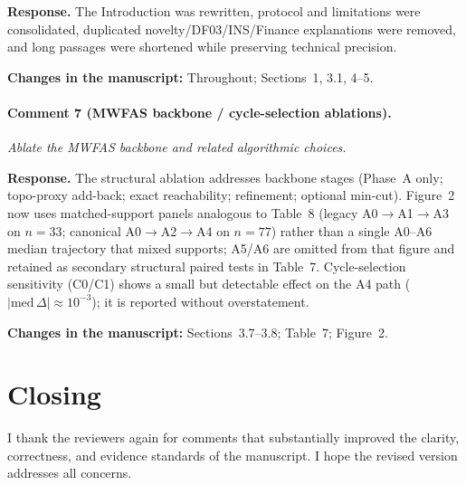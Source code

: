 \documentclass[11pt]{article}
\newcommand{\commentbox}[1]{\par\textit{#1}\par\medskip}
\newcommand{\changes}[1]{\textbf{Changes in the manuscript:} #1\par\medskip}
\begin{document}
\noindent\textbf{Response.}
The Introduction was rewritten, protocol and limitations were consolidated, duplicated novelty/DF03/INS/Finance explanations were removed, and long passages were shortened while preserving technical precision.

\changes{Throughout; Sections~1, 3.1, 4--5.}

\paragraph{Comment 7 (MWFAS backbone / cycle-selection ablations).}
\commentbox{Ablate the MWFAS backbone and related algorithmic choices.}

\noindent\textbf{Response.}
The structural ablation addresses backbone stages (Phase~A only; topo-proxy add-back; exact reachability; refinement; optional min-cut). Figure~2 now uses matched-support panels analogous to Table~8 (legacy A0$\to$A1$\to$A3 on $n=33$; canonical A0$\to$A2$\to$A4 on $n=77$) rather than a single A0--A6 median trajectory that mixed supports; A5/A6 are omitted from that figure and retained as secondary structural paired tests in Table~7. Cycle-selection sensitivity (C0/C1) shows a small but detectable effect on the A4 path ($|\mathrm{med}\,\Delta|\approx 10^{-3}$); it is reported without overstatement.

\changes{Sections~3.7--3.8; Table~7; Figure~2.}

\section*{Closing}

I thank the reviewers again for comments that substantially improved the clarity, correctness, and evidence standards of the manuscript. I hope the revised version addresses all concerns.
\end{document}
